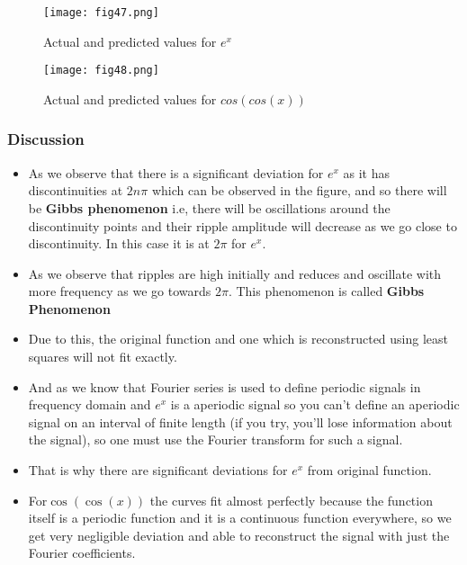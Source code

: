 \documentclass[11pt, a4paper, twoside]{article}
\begin{document}
 	\begin{figure}[!tbh]
   	\centering
   	\texttt{[image: fig47.png]}   
   	\caption{Actual and predicted values for $e^{x}$}
   	\label{fig:sample}
   \end{figure} 

   \begin{figure}[!tbh]
   	\centering
   	\texttt{[image: fig48.png]}   
   	\caption{Actual and predicted values for $cos(cos(x))$}
   	\label{fig:sample}
   \end{figure} 
             \subsubsection{Discussion}

            \begin{itemize}[label=-]

            \item
              As we observe that there is a significant deviation for \(e^{x}\) as
              it has discontinuities at \(2n\pi\) which can be observed in the figure,
              and so there will be \textbf{Gibbs phenomenon} i.e, there will be
              oscillations around the discontinuity points and their ripple
              amplitude will decrease as we go close to discontinuity. In this case
              it is at \(2\pi\) for \(e^{x}\).
            \item
              As we observe that ripples are high initially and reduces and
              oscillate with more frequency as we go towards \(2\pi\). This
              phenomenon is called \textbf{Gibbs Phenomenon}
            \item
              Due to this, the original function and one which is reconstructed using
              least squares will not fit exactly.
            \item
              And as we know that Fourier series is used to define periodic signals
              in frequency domain and \(e^{x}\) is a aperiodic signal so you can't
              define an aperiodic signal on an interval of finite length (if you
              try, you'll lose information about the signal), so one must use the
              Fourier transform for such a signal.
            \item
              That is why there are significant deviations for \(e^{x}\) from original
              function.
            \item
              For\(\cos(\cos(x))\) the curves fit almost perfectly because
              the function itself is a periodic function and it is a continuous
              function everywhere, so we get very negligible deviation and
              able to reconstruct the signal with just the Fourier coefficients.
            \end{itemize}
\end{document}
